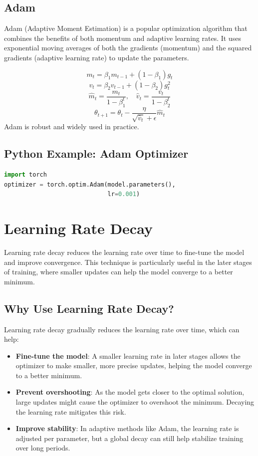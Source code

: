 \begin{notechapter}
\subsection{Adam}
Adam (Adaptive Moment Estimation) is a popular
optimization algorithm that combines the benefits of both
momentum and adaptive learning rates. It uses exponential
moving averages of both the gradients (momentum) and the
squared gradients (adaptive learning rate) to update the
parameters.

\[
m_t = \beta_1 m_{t-1} + (1 - \beta_1) g_t
\]
\[
v_t = \beta_2 v_{t-1} + (1 - \beta_2) g_t^2
\]
\[
\hat{m}_t = \frac{m_t}{1 - \beta_1^t}, \quad \hat{v}_t = \frac{v_t}{1 - \beta_2^t}
\]
\[
\theta_{t+1} = \theta_t - \frac{\eta}{\sqrt{\hat{v}_t} + \epsilon} \hat{m}_t
\]
Adam is robust and widely used in practice.

\subsection{Python Example: Adam Optimizer}
\begin{lstlisting}[language=Python]
import torch
optimizer = torch.optim.Adam(model.parameters(), 
                             lr=0.001)
\end{lstlisting}

\section{Learning Rate Decay}
Learning rate decay reduces the learning rate over time to 
fine-tune the model and improve convergence. This technique 
is particularly useful in the later stages of training, 
where smaller updates can help the model converge to a 
better minimum.

\subsection{Why Use Learning Rate Decay?}
Learning rate decay gradually reduces the learning rate over 
time, which can help:
\begin{itemize}
    \item \textbf{Fine-tune the model}: A smaller learning rate 
          in later stages allows the optimizer to make smaller, 
          more precise updates, helping the model converge to a 
          better minimum.
    \item \textbf{Prevent overshooting}: As the model gets closer 
          to the optimal solution, large updates might cause the 
          optimizer to overshoot the minimum. Decaying the learning 
          rate mitigates this risk.
    \item \textbf{Improve stability}: In adaptive methods like Adam, 
          the learning rate is adjusted per parameter, but a global 
          decay can still help stabilize training over long periods.
\end{itemize}


\end{notechapter}
